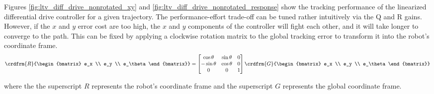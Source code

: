 Figures \ref{fig:ltv_diff_drive_nonrotated_xy} and
\ref{fig:ltv_diff_drive_nonrotated_response} show the tracking performance of
the linearized differential drive controller for a given trajectory. The
performance-effort trade-off can be tuned rather intuitively via the Q and R
gains. However, if the $x$ and $y$ error cost are too high, the $x$ and $y$
components of the controller will fight each other, and it will take longer to
converge to the path. This can be fixed by applying a clockwise rotation matrix
to the global tracking error to transform it into the robot's coordinate frame.
\begin{equation*}
  \crdfrm{R}{\begin{bmatrix}
    e_x \\
    e_y \\
    e_\theta
  \end{bmatrix}} =
  \begin{bmatrix}
    \cos\theta & \sin\theta & 0 \\
    -\sin\theta & \cos\theta & 0 \\
    0 & 0 & 1
  \end{bmatrix}
  \crdfrm{G}{\begin{bmatrix}
    e_x \\
    e_y \\
    e_\theta
  \end{bmatrix}}
\end{equation*}

where the the superscript $R$ represents the robot's coordinate frame and the
superscript $G$ represents the global coordinate frame.


